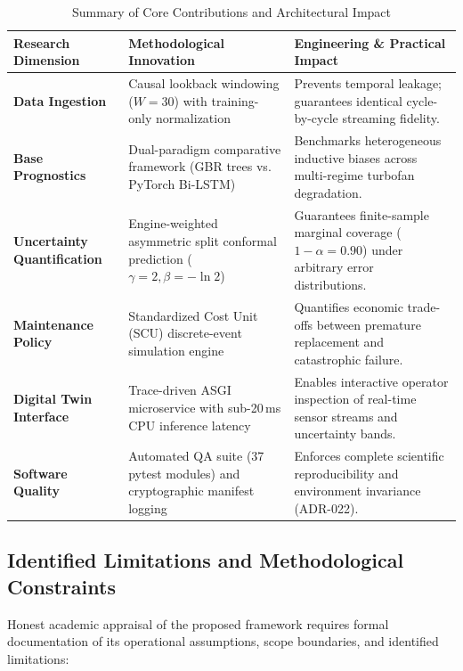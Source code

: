 \documentclass[12pt,a4paper]{article}
\begin{document}
\begin{table}[htbp]
\centering
\small
{}
\caption{Summary of Core Contributions and Architectural Impact}
\label{tab:contributions}
\vspace{4pt}
\begin{tabularx}{\textwidth}{p{3.2cm} p{5.0cm} p{6.2cm}}
\toprule
\textbf{Research Dimension} & \textbf{Methodological Innovation} & \textbf{Engineering \& Practical Impact} \\
\midrule
\textbf{Data Ingestion} & Causal lookback windowing ($W=30$) with training-only normalization & Prevents temporal leakage; guarantees identical cycle-by-cycle streaming fidelity. \\
\textbf{Base Prognostics} & Dual-paradigm comparative framework (GBR trees vs. PyTorch Bi-LSTM) & Benchmarks heterogeneous inductive biases across multi-regime turbofan degradation. \\
\textbf{Uncertainty Quantification} & Engine-weighted asymmetric split conformal prediction ($\gamma=2, \beta=-\ln 2$) & Guarantees finite-sample marginal coverage ($1-\alpha=0.90$) under arbitrary error distributions. \\
\textbf{Maintenance Policy} & Standardized Cost Unit (SCU) discrete-event simulation engine & Quantifies economic trade-offs between premature replacement and catastrophic failure. \\
\textbf{Digital Twin Interface} & Trace-driven ASGI microservice with sub-20\,ms CPU inference latency & Enables interactive operator inspection of real-time sensor streams and uncertainty bands. \\
\textbf{Software Quality} & Automated QA suite (37 pytest modules) and cryptographic manifest logging & Enforces complete scientific reproducibility and environment invariance (ADR-022). \\
\bottomrule
\end{tabularx}
\end{table}

\subsection{Identified Limitations and Methodological Constraints}
Honest academic appraisal of the proposed framework requires formal documentation of its operational assumptions, scope boundaries, and identified limitations:
\end{document}

